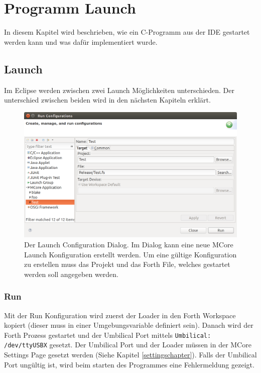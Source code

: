 \chapter{Programm Launch}
In diesem Kapitel wird beschrieben, wie ein C-Programm aus der IDE gestartet werden kann und was dafür implementiert wurde.

\section{Launch}

Im Eclipse werden zwischen zwei Launch Möglichkeiten unterschieden. Der unterschied zwischen beiden wird in den nächsten Kapiteln erklärt.

\begin{figure}[H]
	\centering
		\includegraphics[scale=0.3]{launch/run.png}
		\caption{Der Launch Configuration Dialog. Im Dialog kann eine neue MCore Launch Konfiguration erstellt werden. Um eine gültige Konfiguration zu erstellen muss das Projekt und das Forth File, welches gestartet werden soll angegeben werden.}
		\label{fig:extensionpoint}
\end{figure}

\newpage
\subsection{Run}

Mit der Run Konfiguration wird zuerst der Loader in den Forth Workspace kopiert (dieser muss in einer Umgebungsvariable definiert sein). Danach wird der Forth Prozess gestartet und der Umbilical Port mittels \verb!Umbilical: /dev/ttyUSBX! gesetzt. Der Umbilical Port und der Loader müssen in der MCore Settings Page gesetzt werden (Siehe Kapitel \ref{settingschapter}). Falls der Umbilical Port ungültig ist, wird beim starten des Programmes eine Fehlermeldung gezeigt.

